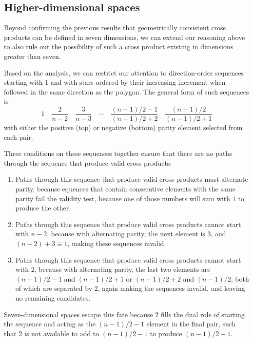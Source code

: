 \documentclass[11pt]{article}
\begin{document}
\subsection{Higher-dimensional spaces}

Beyond confirming the previous results that geometrically consistent cross products can be defined in seven dimensions, we can extend our reasoning above to also rule out the possibility of such a cross product existing in dimensions greater than seven.

Based on the  analysis, we can restrict our attention to direction-order sequences starting with 1 and with stars ordered by their increasing increment when followed in the same direction as the polygon. The general form of such sequences is
%
\begin{equation}
1\hspace{1em}\frac{2}{n-2} \hspace{1em} \frac{3}{n-3}\hspace{1em} \cdots \hspace{1em} \frac{(n-1)/2 -1}{(n-1)/2 +2} \hspace{1em} \frac{(n-1)/2}{(n-1)/2 +1}
\end{equation}
with either the positive (top) or negative (bottom) parity element selected from each pair.


Three conditions on these sequences together ensure that there are no paths through the sequence that produce valid cross products: 
\begin{enumerate}
\item Paths through this sequence that produce valid cross products must alternate parity, because equences that contain consecutive elements with the same parity fail the validity test, because one of those numbers will sum with $1$ to produce the other.
\item Paths through this sequence that produce valid cross products cannot start with $n-2$, because with alternating parity, the next element is $3$, and  $(n-2)+3 \equiv 1$, making these sequences invalid.
\item Paths through this sequence that produce valid cross products cannot start with $2$, because with alternating parity, the last two elements are 
$(n-1)/2 -1$ and $(n-1)/2 +1$ or $(n-1)/2 +2 $ and $(n-1)/2$, both of which are separated by $2$, again making the sequences invalid, and leaving no remaining candidates.
\end{enumerate}
Seven-dimensional spaces escape this fate because $2$ fills the dual role of starting the sequence and acting as the $(n-1)/2 -1$ element in the final pair, such that $2$ is not available to add to $(n-1)/2 -1$ to produce $(n-1)/2 + 1$.
\end{document}
